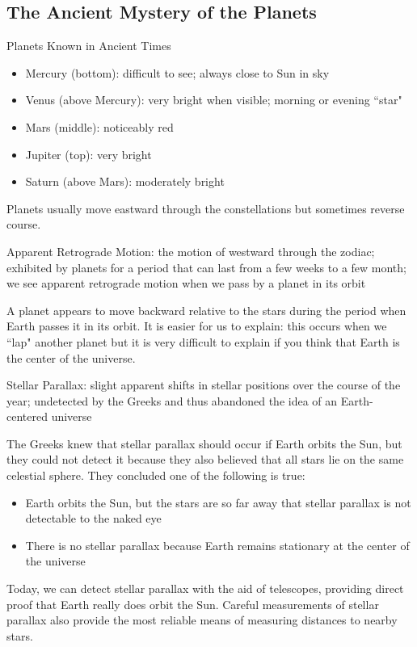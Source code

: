 \documentclass[12pt]{article}
\begin{document}
\subsection{The Ancient Mystery of the Planets} 
Planets Known in Ancient Times \begin{itemize} 
\item Mercury (bottom): difficult to see; always close to Sun in sky 
\item Venus (above Mercury): very bright when visible; morning or evening ``star" 
\item Mars (middle): noticeably red 
\item Jupiter (top): very bright
\item Saturn (above Mars): moderately bright \end{itemize} 
Planets usually move eastward through the constellations but sometimes reverse course. 
\begin{definition} Apparent Retrograde Motion: the motion of westward through the zodiac; exhibited by planets for a period that can last from a few weeks to a few month; we see apparent retrograde motion when we pass by a planet in its orbit \end{definition} 
A planet appears to move backward relative to the stars during the period when Earth passes it in its orbit. 
It is easier for us to explain: this occurs when we ``lap" another planet but it is very difficult to explain if you think that Earth is the center of the universe. 
\begin{definition} Stellar Parallax: slight apparent shifts in stellar positions over the course of the year; undetected by the Greeks and thus abandoned the idea of an Earth-centered universe \end{definition} 
The Greeks knew that stellar parallax should occur if Earth orbits the Sun, but they could not detect it because they also believed that all stars lie on the same celestial sphere. They concluded one of the following is true: \begin{itemize} 
\item Earth orbits the Sun, but the stars are so far away that stellar parallax is not detectable to the naked eye 
\item There is no stellar parallax because Earth remains stationary at the center of the universe \end{itemize} 
Today, we can detect stellar parallax with the aid of telescopes, providing direct proof that Earth really does orbit the Sun. Careful measurements of stellar parallax also provide the most reliable means of measuring distances to nearby stars.
\end{document}
